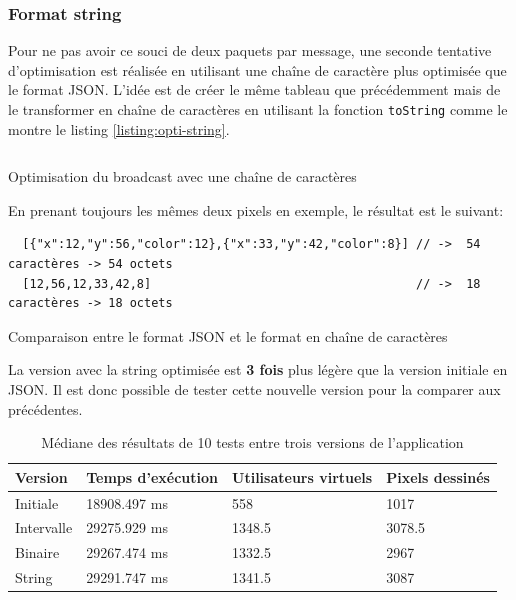 \subsubsection{Format string}

Pour ne pas avoir ce souci de deux paquets par message, une seconde tentative d'optimisation est réalisée en utilisant une chaîne de caractère plus optimisée que le format JSON. L'idée est de créer le même tableau que précédemment mais de le transformer en chaîne de caractères en utilisant la fonction \texttt{toString} comme le montre le listing \ref{listing:opti-string}.

\begin{listing}[H]
  \inputminted[highlightlines={5,6}, linenos]{ts}{assets/figures/opti-string.ts}
  \caption{Optimisation du broadcast avec une chaîne de caractères}
  \label{listing:opti-string}
\end{listing}

En prenant toujours les mêmes deux pixels en exemple, le résultat est le suivant:

\begin{listing}[H]
  \begin{verbatim}
  [{"x":12,"y":56,"color":12},{"x":33,"y":42,"color":8}] // ->  54 caractères -> 54 octets
  [12,56,12,33,42,8]                                     // ->  18 caractères -> 18 octets
\end{verbatim}
  \caption{Comparaison entre le format JSON et le format en chaîne de caractères}
  \label{listing:json-vs-string}
\end{listing}

La version avec la string optimisée est \textbf{3 fois} plus légère que la version initiale en JSON. Il est donc possible de tester cette nouvelle version pour la comparer aux précédentes.

\begin{table}[H]
  \centering
  \begin{tabular}{|l|l|l|l|}
    \hline
    \textbf{Version} & \textbf{Temps d'exécution} & \textbf{Utilisateurs virtuels} & \textbf{Pixels dessinés} \\ \hline
    Initiale         & 18908.497 ms               & 558                            & 1017                     \\ \hline
    Intervalle       & 29275.929 ms               & 1348.5                         & 3078.5                   \\ \hline
    Binaire          & 29267.474 ms               & 1332.5                         & 2967                     \\ \hline
    String           & 29291.747 ms               & 1341.5                         & 3087                     \\ \hline
  \end{tabular}
  \caption{Médiane des résultats de 10 tests entre trois versions de l'application}
  \label{table:third-opti-results}
\end{table}

